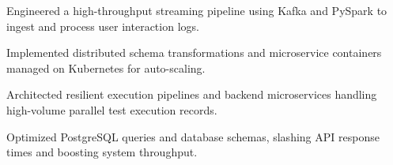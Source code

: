 \documentclass[../main.tex]{subfiles}
\begin{document}
\begin{tightemize}
\item Engineered a high-throughput streaming pipeline using Kafka and PySpark to ingest and process user interaction logs.
\item Implemented distributed schema transformations and microservice containers managed on Kubernetes for auto-scaling.
\end{tightemize}
\sectionsep

\begin{tightemize}
\item Architected resilient execution pipelines and backend microservices handling high-volume parallel test execution records.
\item Optimized PostgreSQL queries and database schemas, slashing API response times and boosting system throughput.
\end{tightemize}
\end{document}
